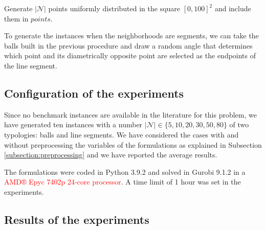 \documentclass[a4paper]{elsarticle}
\begin{document}
{\begin{algorithm}[H]
		Generate $|\mathcal N|$ points uniformly distributed in the square $[0, 100]^2$ and include them in $points$. \\
	\end{algorithm}
	
	To generate the instances when the neighborhoods are segments, we can take the balls built in the previous procedure and draw a random angle that determines which point and its diametrically opposite point are selected as the endpoints of the line segment.
	
	
	\subsection{Configuration of the experiments}
	Since no benchmark instances are available in the literature for this problem, we have generated ten instances with a number $|\mathcal N|\in\{5, 10, 20, 30, 50, 80\}$ of two typologies: balls and line segments. We have considered the cases with and without preprocessing the variables of the formulations as explained in Subsection \ref{subsection:preprocessing} and we have reported the average results. 
	
	The formulations were coded in Python 3.9.2 and solved in Gurobi 9.1.2 \cite{GurobiOptimization2021} in a \textcolor{red}{AMD® Epyc 7402p 24-core processor}. A time limit of 1 hour was set in the experiments.
	
}
\subsection{Results of the experiments}


\end{document}
